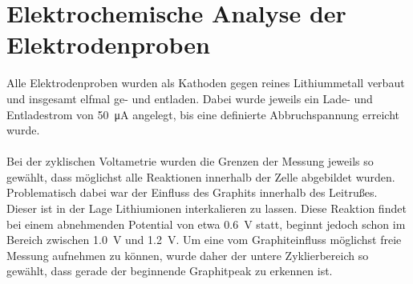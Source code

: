 \documentclass[a4paper, 11pt, headsepline,footsepline,twoside,abstract]{scrbook}
\begin{document}
\section{Elektrochemische Analyse der Elektrodenproben}
\label{elektrochemische_analyse}
Alle Elektrodenproben wurden als Kathoden gegen reines Lithiummetall verbaut und insgesamt elfmal ge- und entladen. Dabei wurde jeweils ein Lade- und Entladestrom von \SI{50}{\micro\ampere} angelegt, bis eine definierte Abbruchspannung erreicht wurde.
\\\\
Bei der zyklischen Voltametrie wurden die Grenzen der Messung jeweils so gewählt, dass möglichst alle Reaktionen innerhalb der Zelle abgebildet wurden. Problematisch dabei war der Einfluss des Graphits innerhalb des Leitrußes. Dieser ist in der Lage Lithiumionen interkalieren zu lassen. Diese Reaktion findet bei einem abnehmenden Potential von etwa \SI{0.6}{\volt} statt, beginnt jedoch schon im Bereich zwischen \SI{1.0}{\volt} und \SI{1.2}{\volt}. Um eine vom Graphiteinfluss möglichst freie Messung aufnehmen zu können, wurde daher der untere Zyklierbereich so gewählt, dass gerade der beginnende Graphitpeak zu erkennen ist.
\end{document}
